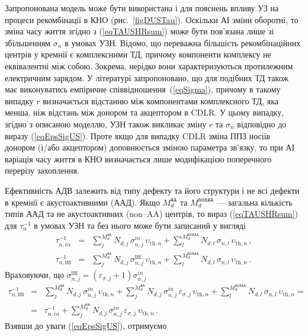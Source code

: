Запропонована модель може бути використана і для пояснень впливу УЗ на процеси рекомбінації в КНО (рис.~\ref{figDUSTau}).
Оскільки АІ зміни оборотні, то зміна часу життя згідно з (\ref{eqTAUSHRsum}) може бути пов'язана лише зі збільшенням
$\sigma_n$ в умовах УЗН.
Відомо, що переважна більшість рекомбінаційних центрів у кремнії є комплексними ТД,
причому компоненти комплексу не еквівалентні між собою.
Зокрема, нерідко вони характеризуються протилежним електричним зарядом.
У літературі \cite{CDLR:R2} запропоновано, що для подібних ТД також має виконуватись емпіричне співвідношення~(\ref{eqSigma}),
причому в такому випадку $r$ визначається відстанню між компонентами комплексного ТД, яка  менша, ніж відстань між донором та акцептором в CDLR.
У цьому випадку, згідно з описаною моделлю, УЗН також викликає зміну $r$ та $\sigma_n$ відповідно до виразу (\ref{eqEpsSigUS}).
Проте якщо для випадку CDLR зміна ППЗ носіїв донором (і/або акцептором) доповнюється зміною параметра зв'язку,
то при АІ варіація часу життя в КНО визначається лише модифікацією поперечного перерізу захоплення.

Ефективність АДВ залежить від типу дефекту та його структури \cite{UST:Medvid}
і не всі дефекти в кремнії є акустоактивними (ААД).
Якщо $M_d^\mathtt{AA}$ та $M_d^\mathtt{nonAA}$ --- загальна кількість типів ААД та не акустоактивних (non--AA) центрів,
то вираз (\ref{eqTAUSHRsum}) для $\tau_{n}^{-1}$ в умовах УЗН та без нього може бути записаний у вигляді
\begin{eqnarray}
\nonumber\tau_{n,in}^{-1}&=&\sum_j^{M_d^\mathtt{AA}}N_{d,j}\,\sigma_{n,j}^{in}\,\upsilon_{\mathrm{th},n}+
\sum_l^{M_d^\mathtt{nonAA}}N_{d,l}\,\sigma_{n,l}\,\upsilon_{\mathrm{th},n}\,,\\
\nonumber\tau_{n,\mathtt{US}}^{-1}&=&\sum_j^{M_d^\mathtt{AA}}N_{d,j}\,\sigma_{n,j}^\mathtt{US}\,\upsilon_{\mathrm{th},n}+
\sum_l^{M_d^\mathtt{nonAA}}N_{d,l}\,\sigma_{n,l}\,\upsilon_{\mathrm{th},n}\,.
\end{eqnarray}
Враховуючи, що $\sigma_{n,j}^\mathtt{US}=(\varepsilon_{\sigma,j}+1)\sigma_{n,j}^{in}$
\begin{eqnarray}
\label{eqEpsSigUSA}
\tau_{n,\mathtt{US}}^{-1}&=&\sum_j^{M_d^\mathtt{AA}}N_{d,j}\,\sigma_{n,j}^{in}\,\upsilon_{\mathrm{th},n}+
\sum_j^{M_d^\mathtt{AA}}N_{d,j}\,\sigma_{n,j}^{in}\,\varepsilon_{\sigma,j}\,\upsilon_{\mathrm{th},n}+
\sum_l^{M_d^\mathtt{nonAA}}N_{d,l}\,\sigma_{n,l}\,\upsilon_{\mathrm{th},n}=\nonumber\\
&=&\tau_{n,in}^{-1}+\sum_j^{M_d^\mathtt{AA}}N_{d,j}\,\sigma_{n,j}^{in}\,\varepsilon_{\sigma,j}\,\upsilon_{\mathrm{th},n}\,.
\end{eqnarray}
Взявши до уваги (\ref{eqEpsSigUS}), отримуємо

